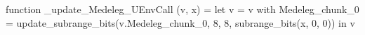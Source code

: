 function _update_Medeleg_UEnvCall (v, x) = let v = { v with Medeleg_chunk_0 = update_subrange_bits(v.Medeleg_chunk_0, 8, 8, subrange_bits(x, 0, 0)) } in
  v

